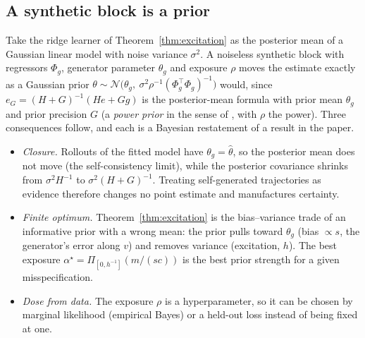 \subsection{A synthetic block is a prior}
Take the ridge learner of Theorem~\ref{thm:excitation} as the posterior mean of a Gaussian linear model with noise variance $\sigma^2$. A noiseless synthetic block with regressors $\Phi_g$, generator parameter $\theta_g$ and exposure $\rho$ moves the estimate exactly as a Gaussian prior $\theta\sim\mathcal N\big(\theta_g,\ \sigma^2\rho^{-1}(\Phi_g^\top\Phi_g)^{-1}\big)$ would, since $e_G=(H+G)^{-1}(He+Gg)$ is the posterior-mean formula with prior mean $\theta_g$ and prior precision $G$ (a \emph{power prior} in the sense of \citealp{ibrahim2000power}, with $\rho$ the power). Three consequences follow, and each is a Bayesian restatement of a result in the paper.
\begin{itemize}[leftmargin=1.2em,itemsep=1pt,topsep=2pt]
\item \emph{Closure.} Rollouts of the fitted model have $\theta_g=\widehat\theta$, so the posterior mean does not move (the self-consistency limit), while the posterior covariance shrinks from $\sigma^2H^{-1}$ to $\sigma^2(H+G)^{-1}$. Treating self-generated trajectories as evidence therefore changes no point estimate and manufactures certainty.
\item \emph{Finite optimum.} Theorem~\ref{thm:excitation} is the bias--variance trade of an informative prior with a wrong mean: the prior pulls toward $\theta_g$ (bias $\propto s$, the generator's error along $v$) and removes variance (excitation, $h$). The best exposure $\alpha^\star=\Pi_{[0,h^{-1}]}(m/(sc))$ is the best prior strength for a given misspecification.
\item \emph{Dose from data.} The exposure $\rho$ is a hyperparameter, so it can be chosen by marginal likelihood (empirical Bayes) or a held-out loss instead of being fixed at one.
\end{itemize}

